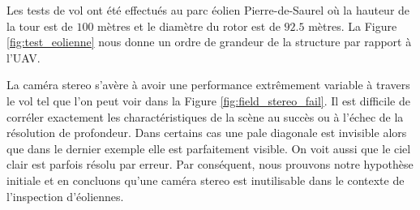 Les tests de vol ont été effectués au parc éolien Pierre-de-Saurel où la hauteur de la tour est de $100$ mètres et le diamètre du rotor est de $92.5$ mètres. La Figure \ref{fig:test_eolienne} nous donne un ordre de grandeur de la structure par rapport à l'UAV.

% 

La caméra stereo s'avère à avoir une performance extrêmement variable à travers le vol tel que l'on peut voir dans la Figure \ref{fig:field_stereo_fail}. Il est difficile de corréler exactement les charactéristiques de la scène au succès ou à l'échec de la résolution de profondeur. Dans certains cas une pale diagonale est invisible alors que dans le dernier exemple elle est parfaitement visible. On voit aussi que le ciel clair est parfois résolu par erreur. Par conséquent, nous prouvons notre hypothèse initiale et en concluons qu'une caméra stereo est inutilisable dans le contexte de l'inspection d'éoliennes.

